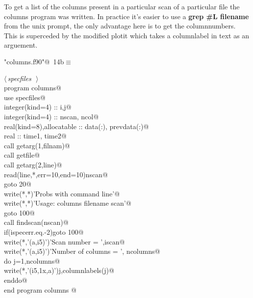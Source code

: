 \documentclass[10pt,a4paper,notitlepage]{article}
\newcommand{\code}[1]{\textbf{\textsf{#1}}} %
\begin{document}
To get a list of the columns present in a particular scan of a particular
file the columns program was written. In practice it's easier to use a
\code{grep \#L filename} from the unix prompt, the only advantage
here is to get the columnnumbers. This is superceded by the modified
plotit which takes a columnlabel in text as an arguement.

\begin{flushleft} \small
\begin{minipage}{\linewidth}\label{scrap17}\raggedright\small
{} \verb@"columns.f90"@\nobreak\ {\footnotesize {14b}}$\equiv$
\vspace{-1ex}
\begin{list}{}{} \item
\mbox{}\verb@@\hbox{$\langle\,${\it specfiles}\nobreak\ {\footnotesize {}}$\,\rangle$}\verb@@\\
\mbox{}\verb@      program columns@\\
\mbox{}\verb@      use specfiles@\\
\mbox{}\verb@      integer(kind=4) :: i,j@\\
\mbox{}\verb@      integer(kind=4) :: nscan, ncol@\\
\mbox{}\verb@      real(kind=8),allocatable :: data(:), prevdata(:)@\\
\mbox{}\verb@      real :: time1, time2@\\
\mbox{}\verb@      call getarg(1,filnam)@\\
\mbox{}\verb@      call getfile@\\
\mbox{}\verb@      call getarg(2,line)@\\
\mbox{}\verb@      read(line,*,err=10,end=10)nscan@\\
\mbox{}\verb@      goto 20@\\
\mbox{}    write(*,*)'Probs with command line'@\\
\mbox{}\verb@      write(*,*)'Usage: columns filename scan'@\\
\mbox{}\verb@      goto 100@\\
\mbox{}    call findscan(nscan)@\\
\mbox{}\verb@      if(ispecerr.eq.-2)goto 100@\\
\mbox{}\verb@      write(*,'(a,i5)')'Scan number = ',iscan@\\
\mbox{}\verb@      write(*,'(a,i5)')'Number of columns = ', ncolumns@\\
\mbox{}\verb@      do j=1,ncolumns@\\
\mbox{}\verb@       write(*,'(i5,1x,a)')j,columnlabels(j)@\\
\mbox{}\verb@      enddo@\\
\mbox{}   end program columns                                                 @{\NWsep}
\end{list}
\vspace{-1.5ex}
\footnotesize
\begin{list}{}{\setlength{\itemsep}{-\parsep}\setlength{\itemindent}{-\leftmargin}}


\end{list}
\end{minipage}
\end{flushleft}
\end{document}

